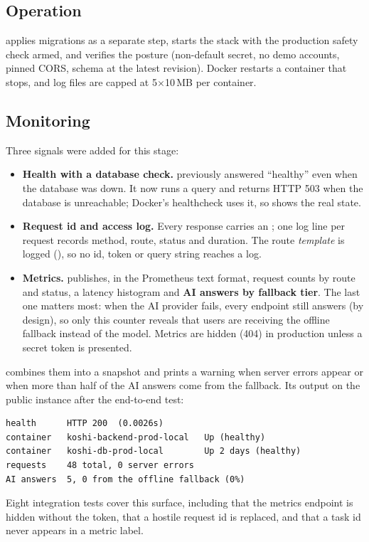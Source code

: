 \documentclass[../main.tex]{subfiles}
\begin{document}
\subsection{Operation}
 applies migrations as a separate step, starts the stack with the
production safety check armed, and verifies the posture (non-default secret, no demo accounts,
pinned CORS, schema at the latest revision). Docker restarts a container that stops, and log files
are capped at 5$\times$10\,MB per container.

\subsection{Monitoring}
Three signals were added for this stage:
\begin{itemize}
  \item \textbf{Health with a database check.}  previously answered ``healthy''
        even when the database was down. It now runs a query and returns HTTP 503 when the database
        is unreachable; Docker's healthcheck uses it, so  shows the real state.
  \item \textbf{Request id and access log.} Every response carries an ; one log
        line per request records method, route, status and duration. The route \emph{template} is
        logged (), so no id, token or query string reaches a log.
  \item \textbf{Metrics.}  publishes, in the Prometheus text format, request
        counts by route and status, a latency histogram and \textbf{AI answers by fallback tier}.
        The last one matters most: when the AI provider fails, every endpoint still answers (by
        design), so only this counter reveals that users are receiving the offline fallback instead
        of the model. Metrics are hidden (404) in production unless a secret token is presented.
\end{itemize}
 combines them into a snapshot and prints a warning when server errors
appear or when more than half of the AI answers come from the fallback. Its output on the public
instance after the end-to-end test:
\begin{verbatim}
health      HTTP 200  (0.0026s)
container   koshi-backend-prod-local   Up (healthy)
container   koshi-db-prod-local        Up 2 days (healthy)
requests    48 total, 0 server errors
AI answers  5, 0 from the offline fallback (0%)
\end{verbatim}
Eight integration tests cover this surface, including that the metrics endpoint is hidden without
the token, that a hostile request id is replaced, and that a task id never appears in a metric label.
\end{document}
